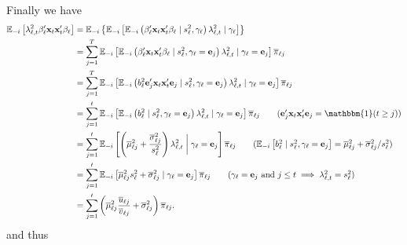 \documentclass{article}
\newcommand{\E}{\mathbb{E}}
\begin{document}
\normalsize
Finally we have
\small
\begin{align*}
    \E_{-i}\left[\lambda_{\ell,t}^2\beta'_{\ell}\mathbf{x}_t\mathbf{x}'_t \beta_\ell\right] &= \E_{-i}\left\{\E_{-i}\left[\E_{-i}\left(\beta'_{\ell}\mathbf{x}_t\mathbf{x}'_t \beta_\ell\;|\; s_\ell^2, \gamma_\ell\right)\lambda_{\ell,t}^2\;|\;\gamma_\ell\right]\right\} \\
    &= \sum_{j=1}^T \E_{-i}\left[\E_{-i}\left(\beta'_{\ell}\mathbf{x}_t\mathbf{x}'_t \beta_\ell\;|\; s_\ell^2, \gamma_\ell= \mathbf{e}_j\right)\lambda_{\ell,t}^2\;|\;\gamma_\ell = \mathbf{e}_j\right]\overline{\pi}_{\ell j} \\
    &= \sum_{j=1}^T \E_{-i}\left[\E_{-i}\left(b_\ell^2 \mathbf{e}'_j\mathbf{x}_t\mathbf{x}'_t \mathbf{e}_j\;|\; s_\ell^2, \gamma_\ell= \mathbf{e}_j\right)\lambda_{\ell,t}^2\;|\;\gamma_\ell = \mathbf{e}_j\right]\overline{\pi}_{\ell j} \\
    &= \sum_{j=1}^t \E_{-i}\left[\E_{-i}\left(b_\ell^2\;|\; s_\ell^2, \gamma_\ell= \mathbf{e}_j\right)\lambda_{\ell,t}^2\;|\;\gamma_\ell = \mathbf{e}_j\right]\overline{\pi}_{\ell j} \tag{$\mathbf{e}'_j\mathbf{x}_t\mathbf{x}'_t \mathbf{e}_j = \mathbbm{1}(t \geq j)$} \\
    &= \sum_{j=1}^t \E_{-i}\left[\left(\overline{\mu}_{\ell j}^2 + \frac{\overline{\sigma}^2_{\ell j}}{s^2_\ell}\right)\lambda_{\ell,t}^2\;\bigg|\;\gamma_\ell = \mathbf{e}_j\right]\overline{\pi}_{\ell j}  \tag{$\E_{-i}\left[b_\ell^2\;|\; s_\ell^2, \gamma_\ell= \mathbf{e}_j\right] = \overline{\mu}_{\ell j}^2 + \overline{\sigma}^2_{\ell j} / s^2_\ell$} \\
    &= \sum_{j=1}^t \E_{-i}\left[\overline{\mu}_{\ell j}^2 s^2_\ell + \overline{\sigma}^2_{\ell j}\;|\;\gamma_\ell = \mathbf{e}_j\right]\overline{\pi}_{\ell j}  \tag{$\gamma_\ell = \mathbf{e}_j$ and $j \leq t \implies \lambda_{\ell,t}^2 = s_\ell^2$} \\
    &= \sum_{j=1}^t \left(\overline{\mu}_{\ell j}^2 \frac{\overline{u}_{\ell j}}{\overline{v}_{\ell j}} + \overline{\sigma}^2_{\ell j}\right)\overline{\pi}_{\ell j}.
\end{align*}
\normalsize
and thus 
\small
\end{document}
